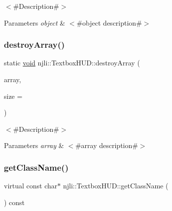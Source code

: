 $<$\#\+Description\#$>$


\begin{DoxyParams}{Parameters}
{\em object} & $<$\#object description\#$>$ \\
\hline
\end{DoxyParams}
\mbox{\label{classnjli_1_1_textbox_h_u_d_ad3449d4687ff3cce19b3aaa5e6d415b0}} 
\subsubsection{\texorpdfstring{destroy\+Array()}{destroyArray()}}
{\footnotesize\ttfamily static \mbox{\hyperlink{_thread_8h_af1e856da2e658414cb2456cb6f7ebc66}{void}} njli\+::\+Textbox\+H\+U\+D\+::destroy\+Array (\begin{DoxyParamCaption}\item[{\mbox{\hyperlink{classnjli_1_1_textbox_h_u_d}{Textbox\+H\+UD}} $\ast$$\ast$}]{array,  }\item[{const \mbox{\hyperlink{_util_8h_a10e94b422ef0c20dcdec20d31a1f5049}{u32}}}]{size = {} }\end{DoxyParamCaption})\hspace{0.3cm}{\ttfamily [static]}}

$<$\#\+Description\#$>$


\begin{DoxyParams}{Parameters}
{\em array} & $<$\#array description\#$>$ \\
\hline
\end{DoxyParams}
\mbox{\label{classnjli_1_1_textbox_h_u_d_a72f4534b34d0ba712ec4ecd604bda84a}} 
\subsubsection{\texorpdfstring{get\+Class\+Name()}{getClassName()}}
{\footnotesize\ttfamily virtual const char$\ast$ njli\+::\+Textbox\+H\+U\+D\+::get\+Class\+Name (\begin{DoxyParamCaption}{ }\end{DoxyParamCaption}) const\hspace{0.3cm}{\ttfamily [virtual]}}

